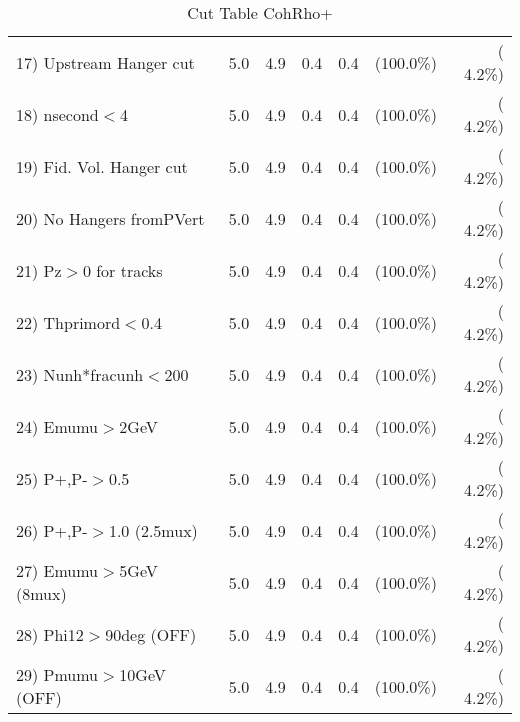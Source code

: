 \begin{table}[h!]
\begin{tabular}{||l||r|r|r|r|r|r||}
 17) Upstream Hanger cut  &          5.0 &          4.9 &          0.4 &          0.4 & (100.0\%) & (  4.2\%) \\
 18) nsecond$<$4          &          5.0 &          4.9 &          0.4 &          0.4 & (100.0\%) & (  4.2\%) \\
 19) Fid. Vol. Hanger cut &          5.0 &          4.9 &          0.4 &          0.4 & (100.0\%) & (  4.2\%) \\
 20) No Hangers fromPVert &          5.0 &          4.9 &          0.4 &          0.4 & (100.0\%) & (  4.2\%) \\
 21) Pz$>$0 for tracks    &          5.0 &          4.9 &          0.4 &          0.4 & (100.0\%) & (  4.2\%) \\
 22) Thprimord$<$0.4      &          5.0 &          4.9 &          0.4 &          0.4 & (100.0\%) & (  4.2\%) \\
 23) Nunh*fracunh$<$200   &          5.0 &          4.9 &          0.4 &          0.4 & (100.0\%) & (  4.2\%) \\
 24) Emumu$>$2GeV         &          5.0 &          4.9 &          0.4 &          0.4 & (100.0\%) & (  4.2\%) \\
 25) P+,P-$>$0.5          &          5.0 &          4.9 &          0.4 &          0.4 & (100.0\%) & (  4.2\%) \\
 26) P+,P-$>$1.0 (2.5mux) &          5.0 &          4.9 &          0.4 &          0.4 & (100.0\%) & (  4.2\%) \\
 27) Emumu$>$5GeV  (8mux) &          5.0 &          4.9 &          0.4 &          0.4 & (100.0\%) & (  4.2\%) \\
 28) Phi12$>$90deg  (OFF) &          5.0 &          4.9 &          0.4 &          0.4 & (100.0\%) & (  4.2\%) \\
 29) Pmumu$>$10GeV  (OFF) &          5.0 &          4.9 &          0.4 &          0.4 & (100.0\%) & (  4.2\%) \\
 \hline
 \hline
 \end{tabular}
 \caption{Cut Table  CohRho+  }
 \label{tab-cutcohjpsi-mumu_anumunc}
 \end{table}
